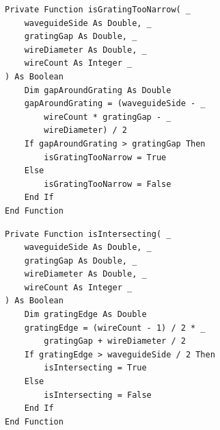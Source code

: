 \documentclass[11pt,a4paper,twoside,openany]{report}
\begin{document}
\begin{lstlisting}[caption={Check for a gap around the grating}, label={lst:is-grating-too-narrow}, language=VBScript]
Private Function isGratingTooNarrow( _
    waveguideSide As Double, _
    gratingGap As Double, _
    wireDiameter As Double, _
    wireCount As Integer _
) As Boolean
    Dim gapAroundGrating As Double
    gapAroundGrating = (waveguideSide - _
        wireCount * gratingGap - _
        wireDiameter) / 2
    If gapAroundGrating > gratingGap Then
        isGratingTooNarrow = True
    Else
        isGratingTooNarrow = False
    End If
End Function
\end{lstlisting}

\begin{lstlisting}[caption={Check for intersection with waveguide walls}, label={lst:is-intersecting}, language=VBScript]
Private Function isIntersecting( _
    waveguideSide As Double, _
    gratingGap As Double, _
    wireDiameter As Double, _
    wireCount As Integer _
) As Boolean
    Dim gratingEdge As Double
    gratingEdge = (wireCount - 1) / 2 * _
        gratingGap + wireDiameter / 2
    If gratingEdge > waveguideSide / 2 Then
        isIntersecting = True
    Else
        isIntersecting = False
    End If
End Function
\end{lstlisting}

\printnomenclature

\printbibliography[heading=bibintoc]

\printindex
\end{document}

